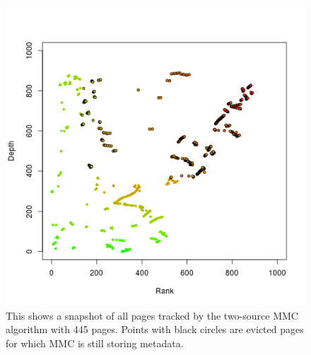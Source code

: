   \begin{figure}
  \centering
  \includegraphics[width=6in]{../media/cache_dump_image_445_445_1780_4_0008090.png}
  \caption[An internal view of a 445 page MMC cache]{This shows a snapshot of
  all pages tracked by the two-source MMC algorithm with 445 pages. Points with
  black circles are evicted pages for which MMC is still storing metadata.}
  \label{fig:cache_dump_445_financial1}
  \end{figure}

